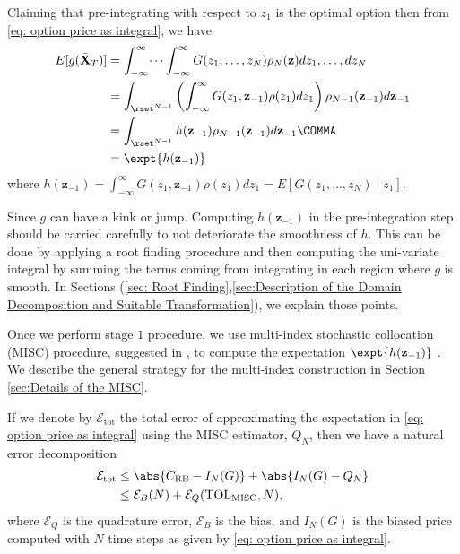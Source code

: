 Claiming that pre-integrating with respect to $z_1$ is the optimal option then from \eqref{eq: option price as integral}, we have
\begin{align}\label{eq: pre_integration_step_wrt_y1}
E[g(\bar{\mathbf{X}}_T)]&=\int_{-\infty}^{\infty} \dots \int_{-\infty}^{\infty} G(z_1,\dots,z_N) \rho_N(\mathbf{z}) dz_1,\dots,dz_N \nonumber\\ 
&=\int_{\rset^{N-1}} \left(\int_{-\infty}^\infty G(z_1,\mathbf{z}_{-1}) \rho(z_1) dz_1  \right) \rho_{N-1}(\mathbf{z}_{-1}) d\mathbf{z}_{-1}\nonumber\\	
&=\int_{\rset^{N-1}} h(\mathbf{z}_{-1}) \rho_{N-1}(\mathbf{z}_{-1}) d\mathbf{z}_{-1}\COMMA \\ \nonumber
	&=\expt{h(\mathbf{z}_{-1})}
\end{align}
where $h(\mathbf{z}_{-1})=\int_{-\infty}^\infty G(z_1,\mathbf{z}_{-1}) \rho(z_1) dz_1=  E\left[ G\left(z_1, \ldots, z_N \right)  \mid z_1\right] $.

Since $g$ can have a kink  or jump. Computing $h(\mathbf{z}_{-1})$ in the pre-integration step should be carried carefully to not deteriorate the smoothness of $h$. This can be done by applying a root finding procedure and then computing the uni-variate integral by summing the terms coming from integrating in each region where $g$ is smooth. In Sections (\ref{sec: Root Finding},\ref{sec:Description of the Domain Decomposition and Suitable Transformation}), we explain those points.

Once we perform stage $1$ procedure,  we use  multi-index stochastic collocation (MISC) procedure, suggested in \cite{haji2016multi}, to compute the expectation $\expt{h(\mathbf{z}_{-1})}$ . We describe the general strategy for the multi-index construction in Section \ref{sec:Details of the MISC}. 

If we denote by $\mathcal{E}_{\text{tot}}$ the total error of approximating the  expectation in \eqref{eq: option price as integral} using the MISC estimator, $Q_N$, then we have a natural error decomposition
\begin{align}\label{eq:total_error}
\mathcal{E}_{\text{tot}} & \le \abs{C_{\text{RB}}- I_{N}(G)}+\abs{I_{N}(G)-Q_{N}}\nonumber\\
  & \le \mathcal{E}_B(N)+ \mathcal{E}_Q(\text{TOL}_{\text{MISC}},N),
\end{align}
where  $\mathcal{E}_Q$ is the quadrature error, $\mathcal{E}_B$  is the bias, and $I_{N}(G)$ is the biased price computed with $N$ time steps as given by \eqref{eq: option price as integral}.


